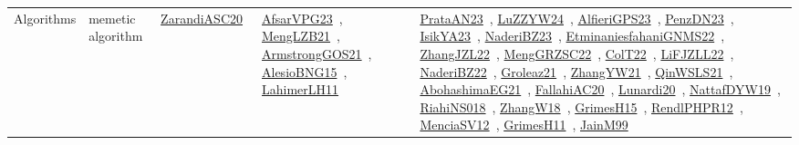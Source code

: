 {\begin{longtable}{lp{3cm}>{\raggedright\arraybackslash}p{6cm}>{\raggedright\arraybackslash}p{6cm}>{\raggedright\arraybackslash}p{8cm}}
Algorithms & memetic algorithm & \href{../works/ZarandiASC20.pdf}{ZarandiASC20}~\cite{ZarandiASC20} & \href{../works/AfsarVPG23.pdf}{AfsarVPG23}~\cite{AfsarVPG23}, \href{../works/MengLZB21.pdf}{MengLZB21}~\cite{MengLZB21}, \href{../works/ArmstrongGOS21.pdf}{ArmstrongGOS21}~\cite{ArmstrongGOS21}, \href{../works/AlesioBNG15.pdf}{AlesioBNG15}~\cite{AlesioBNG15}, \href{../works/LahimerLH11.pdf}{LahimerLH11}~\cite{LahimerLH11} & \href{../works/PrataAN23.pdf}{PrataAN23}~\cite{PrataAN23}, \href{../works/LuZZYW24.pdf}{LuZZYW24}~\cite{LuZZYW24}, \href{../works/AlfieriGPS23.pdf}{AlfieriGPS23}~\cite{AlfieriGPS23}, \href{../works/PenzDN23.pdf}{PenzDN23}~\cite{PenzDN23}, \href{../works/IsikYA23.pdf}{IsikYA23}~\cite{IsikYA23}, \href{../works/NaderiBZ23.pdf}{NaderiBZ23}~\cite{NaderiBZ23}, \href{../works/EtminaniesfahaniGNMS22.pdf}{EtminaniesfahaniGNMS22}~\cite{EtminaniesfahaniGNMS22}, \href{../works/ZhangJZL22.pdf}{ZhangJZL22}~\cite{ZhangJZL22}, \href{../works/MengGRZSC22.pdf}{MengGRZSC22}~\cite{MengGRZSC22}, \href{../works/ColT22.pdf}{ColT22}~\cite{ColT22}, \href{../works/LiFJZLL22.pdf}{LiFJZLL22}~\cite{LiFJZLL22}, \href{../works/NaderiBZ22.pdf}{NaderiBZ22}~\cite{NaderiBZ22}, \href{../works/Groleaz21.pdf}{Groleaz21}~\cite{Groleaz21}, \href{../works/ZhangYW21.pdf}{ZhangYW21}~\cite{ZhangYW21}, \href{../works/QinWSLS21.pdf}{QinWSLS21}~\cite{QinWSLS21}, \href{../works/AbohashimaEG21.pdf}{AbohashimaEG21}~\cite{AbohashimaEG21}, \href{../works/FallahiAC20.pdf}{FallahiAC20}~\cite{FallahiAC20}, \href{../works/Lunardi20.pdf}{Lunardi20}~\cite{Lunardi20}, \href{../works/NattafDYW19.pdf}{NattafDYW19}~\cite{NattafDYW19}, \href{../works/RiahiNS018.pdf}{RiahiNS018}~\cite{RiahiNS018}, \href{../works/ZhangW18.pdf}{ZhangW18}~\cite{ZhangW18}, \href{../works/GrimesH15.pdf}{GrimesH15}~\cite{GrimesH15}, \href{../works/RendlPHPR12.pdf}{RendlPHPR12}~\cite{RendlPHPR12}, \href{../works/MenciaSV12.pdf}{MenciaSV12}~\cite{MenciaSV12}, \href{../works/GrimesH11.pdf}{GrimesH11}~\cite{GrimesH11}, \href{../works/JainM99.pdf}{JainM99}~\cite{JainM99}\\

\end{longtable}}
